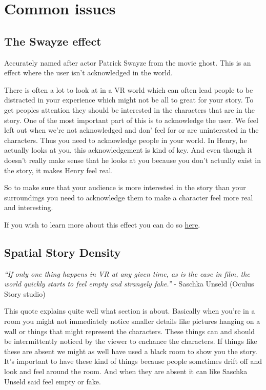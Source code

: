 \documentclass{report}
\begin{document}
				
				\section{Common issues}
				
				\subsection{The Swayze effect}
				Accurately named after actor Patrick Swayze from the movie ghost. This is an effect where the user isn't acknowledged in the world.
				
				There is often a lot to look at in a VR world which can often lead people to be distracted in your experience which might not be all to great for your story. To get peoples attention they should be interested in the characters that are in the story. One of the most important part of this is to acknowledge the user. We feel left out when we're not acknowledged and don' feel for or are uninterested in the characters. Thus you need to acknowledge people in your world. In Henry, he actually looks at you, this acknowledgement is kind of key. And even though it doesn't really make sense that he looks at you because you don't actually exist in the story, it makes Henry feel real.
				
				So to make sure that your audience is more interested in the story than your surroundings you need to acknowledge them to make a character feel more real and interesting.
				
				If you wish to learn more about this effect you can do so  \href{https://www.oculus.com/story-studio/blog/the-swayze-effect/}{here}.
				
				\subsection{Spatial Story Density}
				\textit{``If only one thing happens in VR at any given time, as is the case in film, the world quickly starts to feel empty and strangely fake.''} - Saschka Unseld (Oculus Story studio)

				This quote explains quite well what section is about. Basically when you're in a room you might not immediately notice smaller details like pictures hanging on a wall or things that might represent the characters. These things can and should be intermittently noticed by the viewer to enchance the characters. If things like these are absent we might as well have used a black room to show you the story. 				
				It's important to have these kind of things because people sometimes drift off and look and feel around the room. And when they are absent it can like Saschka Unseld said feel empty or fake.
				
\end{document}
